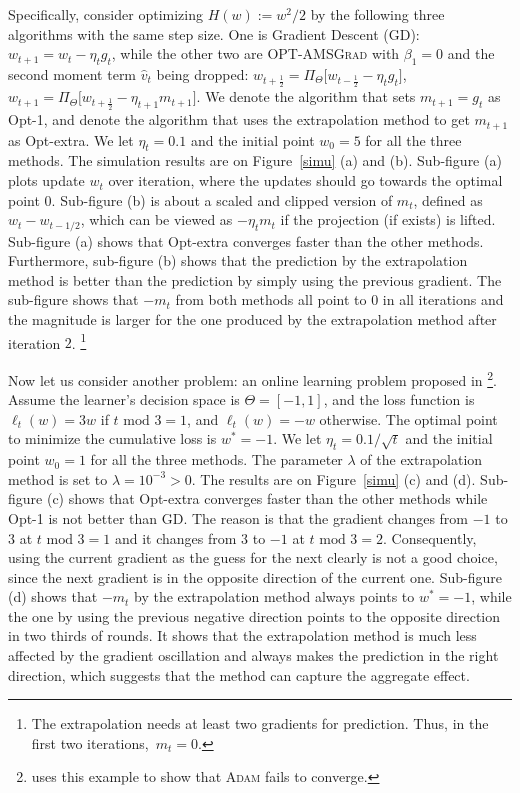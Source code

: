 \documentclass[twoside]{article}
\begin{document}
Specifically, consider optimizing $H(w) := w^2/2 $ by the following three algorithms with the same step size.
One is Gradient Descent (GD): $w_{t+1} = w_t - \eta_t g_t$, while the other two are \textsc{OPT-AMSGrad} with $\beta_1=0$ and the second moment term $\hat{v}_t$ being dropped: $w_{t+\frac{1}{2}} = \Pi_{\Theta}\big[ w_{t-\frac{1}{2}} - \eta_t g_t \big]$, $w_{t+1} = \Pi_{\Theta}\big[ w_{t+\frac{1}{2}} - \eta_{t+1} m_{t+1} \big]$. 
We denote the algorithm that sets $m_{t+1}= g_t$ as Opt-1, and denote the algorithm that uses the extrapolation method to get $m_{t+1}$ as Opt-extra.
We let $\eta_t=0.1$ and the initial point $w_0=5$ for all the three methods.
The simulation results are on Figure~\ref{simu} (a) and (b). Sub-figure (a) plots update $w_t$ over iteration, where the updates should go towards the optimal point $0$.
Sub-figure (b) is about a scaled and clipped version of $m_t$, defined as $w_t - w_{t-1/2}$, which can be viewed as $- \eta_t m_{t}$ if the projection (if exists) is lifted.
Sub-figure (a) shows that Opt-extra converges faster than the other methods. 
Furthermore, sub-figure (b) shows that the prediction by the extrapolation method is better than the prediction by simply using the previous gradient. 
The sub-figure shows that $-m_t$ from both methods all point to $0$ in all iterations and the magnitude is larger for the one produced by the extrapolation method after iteration $2$. \footnote{The extrapolation needs at least two gradients for prediction. Thus, in the first two iterations,~$m_t=0$.}

Now let us consider another problem: an online learning problem proposed in \citep{RKK18}
\footnote{\citep{RKK18} uses this example to show that \textsc{Adam} \citep{KB15} fails to converge.}.
Assume the learner's decision space is $\Theta=[-1,1]$, and the loss function is $\ell_t(w) = 3 w$ if $t \text{ mod } 3 = 1$, and $\ell_t(w) = - w$ otherwise.
The optimal point to minimize the cumulative loss is $w^*=-1$.
We let $\eta_t=0.1 / \sqrt{t}$ and the initial point $w_0=1$ for all the three methods.
The parameter $\lambda$ of the extrapolation method is set to $\lambda=10^{-3}>0$. 
The results are on Figure~\ref{simu} (c) and (d).
Sub-figure (c) shows that Opt-extra converges faster than the other methods while Opt-1 is not better than GD.
The reason is that the gradient changes from $-1$ to $3$ at $t \text{ mod } 3 = 1$ and it changes from $3$ to $-1$ at $t \text{ mod } 3 = 2$.
Consequently, using the current gradient as the guess for the next clearly is not a good choice, since the next gradient is in the opposite direction of the current one.
Sub-figure (d) shows that $-m_t$ by the extrapolation method always points to $w^*=-1$, while the one by using the previous negative direction points to the opposite direction in two thirds of rounds. It shows that the extrapolation method is much less affected by the gradient oscillation and always makes the prediction in the right direction, which suggests that the method can capture the aggregate effect.



\end{document}
